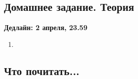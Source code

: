 \subsection{Домашнее задание. Теория}
\textbf{Дедлайн: 2 апреля, 23.59}

\begin{enumerate}

  \item 
  
\end{enumerate}

\subsection{Что почитать...}

\begin{itemize}
  
\end{itemize}


\clearpage
